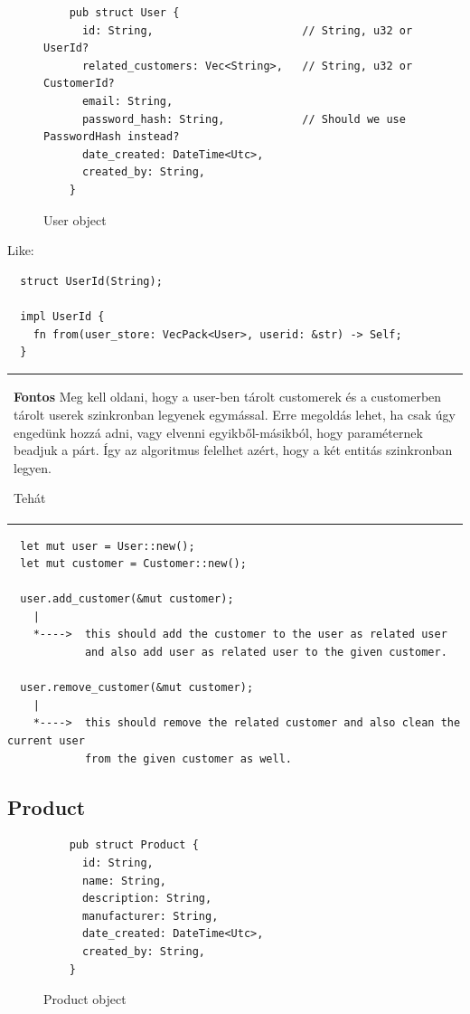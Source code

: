 \documentclass{article}
\begin{document}
\begin{figure}[!htb]
  \caption{User object}
  \begin{verbatim}
    pub struct User {
      id: String,                       // String, u32 or UserId?
      related_customers: Vec<String>,   // String, u32 or CustomerId?
      email: String,
      password_hash: String,            // Should we use PasswordHash instead?
      date_created: DateTime<Utc>,
      created_by: String,
    }
  \end{verbatim}
\end{figure}

Like:

\begin{verbatim}
  struct UserId(String);
  
  impl UserId {
    fn from(user_store: VecPack<User>, userid: &str) -> Self;
  }
\end{verbatim}

\begin{tabular}{|p{10cm}}
  \textbf{Fontos}
  Meg kell oldani, hogy a user-ben tárolt customerek és a customerben tárolt userek
  szinkronban legyenek egymással. Erre megoldás lehet, ha csak úgy engedünk hozzá adni,
  vagy elvenni egyikből-másikból, hogy paraméternek beadjuk a párt. Így az algoritmus felelhet
  azért, hogy a két entitás szinkronban legyen.

  Tehát
\end{tabular}

\begin{verbatim}
  let mut user = User::new();
  let mut customer = Customer::new();

  user.add_customer(&mut customer);
    |
    *---->  this should add the customer to the user as related user
            and also add user as related user to the given customer.

  user.remove_customer(&mut customer);
    |
    *---->  this should remove the related customer and also clean the current user
            from the given customer as well.
\end{verbatim}

\subsection{Product}

\begin{figure}[!htb]
  \caption{Product object}
  \begin{verbatim}
    pub struct Product {
      id: String,
      name: String,
      description: String,
      manufacturer: String,
      date_created: DateTime<Utc>,
      created_by: String,
    }
  \end{verbatim}
\end{figure}
\end{document}
